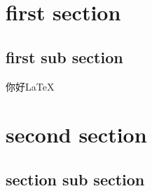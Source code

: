 \documentclass[11pt,a4paper,adobefonts]{ctexbook}
\begin{document}
\section{first section}
\subsection{first sub section}
你好\LaTeX

\section{second section}
\subsection{section sub section}
\end{document}
